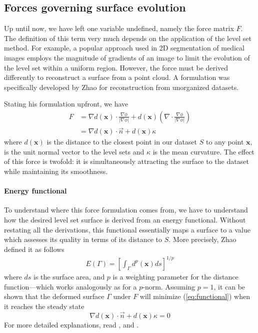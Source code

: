 \documentclass{article}
\begin{document}
\subsection{Forces governing surface evolution}

Up until now, we have left one variable undefined, namely the force matrix
$F$.  The definition of this term very much depends on the application of the
level set method. For example, a popular approach used in 2D segmentation of
medical images employs the magnitude of gradients of an image to limit the
evolution of the level set within a uniform region.  However, the force must
be derived differently to reconstruct a surface from a point cloud. A
formulation was specifically developed by Zhao \cite{zhao2000implicit}
\cite{zhao2001fast} for reconstruction from unorganized datasets.

Stating his formulation upfront, we have
\begin{align}
    \label{eq:force}
    F &= \nabla d(\mathbf{x}) \cdot \frac{\nabla \phi}{| \nabla \phi |} +
    d(\mathbf{x}) \left(\nabla \cdot \frac{\nabla \phi}{|\nabla \phi|}
    \right) \\
    &= \nabla d(\mathbf{x}) \cdot \vec{n} + d(\mathbf{x})\kappa
\end{align}
where $d(\mathbf{x})$ is the distance to the closest point in our dataset $S$
to any point $\mathbf{x}$,  is the unit normal vector to the level sets
and $\kappa$ is the mean curvature. The effect of this force is twofold: it is
simultaneously attracting the surface to the dataset while maintaining its
smoothness.

\paragraph{Energy functional}
To understand where this force formulation comes from, we have to understand
how the desired level set surface is derived from an energy functional.
Without restating all the derivations, this functional essentially maps a
surface to a value which assesses its quality in terms of its distance to
$S$. More precisely, Zhao \cite{zhao2000implicit} defined it as follows
\begin{align}
    \label{eq:functional}
    E(\Gamma) = \left[\int_\Gamma d^p(\mathbf{x}) ds\right]^{1/p}
\end{align}
where $ds$ is the surface area, and $p$ is a weighting parameter for the
distance function---which works analogously as for a $p$-norm. Assuming $p=1$,
it can be shown that the deformed surface $\Gamma$ under $F$ will minimize
(\ref{eq:functional}) when it reaches the steady state
\[
\nabla d(\mathbf{x}) \cdot \vec{n} + d(\mathbf{x}) \kappa = 0
\]
For more detailed explanations, read \cite{zhao2000implicit},
\cite{zhao2001fast} and \cite{savadjiev2003surface}.
\end{document}
